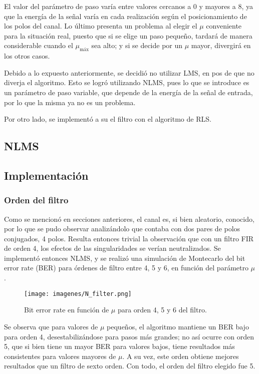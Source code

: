 \documentclass[main.tex]{subfiles}
\begin{document}
El valor del parámetro de paso varía entre valores cercanos a 0 y mayores a 8, 
ya que la energ\'ia de la se\~nal var\'ia en cada realizaci\'on seg\'un el posicionamiento de los polos del canal. Lo último presenta un problema al elegir el $\mu$ conveniente para la situación real,
puesto que si se elige un paso pequeño, tardará de manera considerable cuando el $\mu_\text{máx}$ sea alto;
y si se decide por un $\mu$ mayor, divergirá en los otros casos. \newline

Debido a lo expuesto anteriormente, se decidió no utilizar LMS, en pos de que no diverja el algoritmo. 
Esto se logró utilizando NLMS, pues lo que se introduce es un parámetro de paso variable, que depende
de la energía de la señal de entrada, por lo que la misma ya no es un problema.

Por otro lado, se implement\'o a su el filtro con el algoritmo de RLS.

\subsection*{NLMS}
\subsection*{Implementación}
\subsubsection*{Orden del filtro}
Como se mencionó en secciones anteriores, el canal es, si bien aleatorio, conocido, por 
lo que se pudo observar analizándolo que contaba con dos pares de polos conjugados, 4 polos.
Resulta entonces trivial la observación que con un filtro FIR de orden 4, los efectos 
de las singularidades se verían neutralizados. Se implementó entonces NLMS, y se realizó
una simulación de Montecarlo del bit error rate (BER) para órdenes de filtro entre 4, 5 y 6, en función del parámetro 
$\mu$.

\begin{figure}[H]
    \centering
    \texttt{[image: imagenes/N\_filter.png]}
    \caption{Bit error rate en función de $\mu$ para orden 4, 5 y 6 del filtro.}
\end{figure}

Se observa que para valores de $\mu$ pequeños, el algoritmo mantiene un BER bajo 
para orden 4, desestabilizándose para pasos más grandes; no así ocurre con orden 5, 
que si bien tiene un mayor BER para valores bajos, tiene resultados más consistentes
para valores mayores de $\mu$. A su vez, este orden obtiene mejores resultados que un 
filtro de sexto orden. Con todo, el orden del filtro elegido fue 5.
\end{document}
